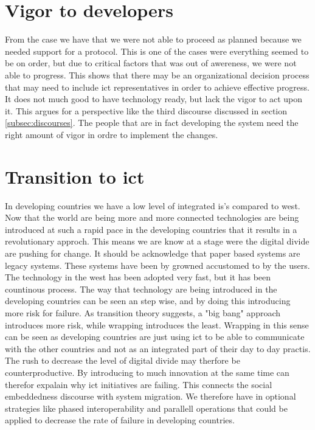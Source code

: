 \cite{internet:stats}
\cite{mobile:think}

\section{Vigor to developers}
From the case  we have that we were not able to proceed as planned because we needed support for a protocol.
This is one of the cases were everything seemed to be on order, but due to critical factors that was out of awereness, we were not able to progress. 
This shows that there may be an organizational decision process that may need to include \gls{ict} representatives in order to achieve effective progress. 
It does not much good to have technology ready, but lack the vigor to act upon it. 
This argues for a perspective like the third discourse discussed in section \ref{subsec:discourses}. 
The people that are in fact developing the system need the right amount of vigor in ordre to implement the changes.

\section{Transition to \gls{ict}}
In developing countries we have a low level of integrated \gls{is}'s compared to west.
Now that the world are being more and more connected technologies are being introduced at such a rapid pace in the developing countries that it results in a revolutionary approch.
This means we are know at a stage were the digital divide are pushing for change.
It should be acknowledge that paper based systems are legacy systems. 
These systems have been by growned accustomed to by the users. 
The technology in the west has been adopted very fast, but it has been countinous process. 
The way that technology are being introduced in the developing countries can be seen an step wise, and by doing this introducing more risk for failure. 
As transition theory suggests, a "big bang" approach introduces more risk, while wrapping introduces the least. 
Wrapping in this sense can be seen as developing countries are just using \gls{ict} to be able to communicate with the other countries and not as an integrated part of their day to day practis. 
The rush to decrease the level of digital divide may therfore be counterproductive. 
By introducing to much innovation at the same time can therefor expalain why \gls{ict} initiatives are failing.
This connects the social embeddedness discourse with system migration. 
We therefore have in optional strategies like phased interoperability and parallell operations that could be applied to decrease the rate of failure in developing countries. 

